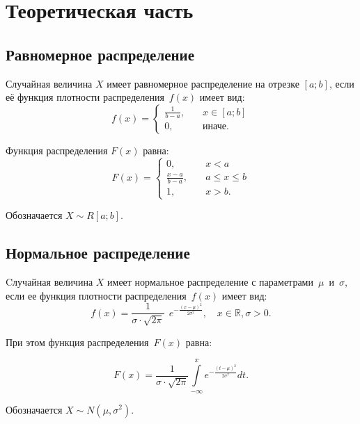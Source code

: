 \chapter{Теоретическая часть}

\section{Равномерное распределение}

Случайная величина $X$ имеет равномерное распределение на отрезке $[a; b]$, если её функция плотности распределения~$f(x)$ имеет вид:
\begin{equation}
	f(x) =
	\begin{cases}
		\frac{1}{b - a}, & \quad x \in [a; b]\\
		0,  & \quad \text{иначе}.
	\end{cases}
\end{equation}

Функция распределения $F(x)$ равна:
\begin{equation}
	F(x) =
	\begin{cases}
		0, & \quad x < a \\
		\frac{x - a}{b - a}, & \quad a \le x \le b \\
		1,  & \quad x > b.
	\end{cases}
\end{equation}

Обозначается $X \sim R[a; b]$.

\section{Нормальное распределение}

Cлучайная величина $X$ имеет нормальное распределение с параметрами~$\mu$~и~$\sigma$, если ее функция плотности распределения~$f(x)$ имеет вид:
\begin{equation}
	f(x) = \frac{1}{\sigma \cdot \sqrt{2\pi}}~~e^{\displaystyle-\frac{(x -
			\mu)^2}{2\sigma^2}}, \quad x \in \mathbb{R}, \sigma > 0.
\end{equation}

При этом функция распределения~$F(x)$ равна:

\begin{equation}
	F(x) = \frac{1}{\sigma \cdot \sqrt{2\pi}} \int\limits_{-\infty}^{x}
	e^{\displaystyle-\frac{(t - \mu)^2}{2\sigma^2}} dt.
\end{equation}

Обозначается $X \sim N(\mu, \sigma^2)$.


